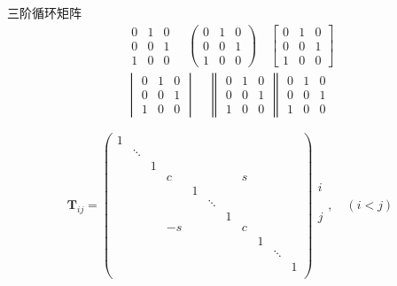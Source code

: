 \documentclass[UTF8, a4paper, 12pt, oneside, onecolumn]{article}
\begin{document}
三阶循环矩阵
\begin{gather*}
	\begin{matrix}
		0 & 1 & 0 \\
		0 & 0 & 1 \\
		1 & 0 & 0
	\end{matrix}\quad
	\begin{pmatrix}
		0 & 1 & 0 \\
		0 & 0 & 1 \\
		1 & 0 & 0
	\end{pmatrix}\quad
	\begin{bmatrix}
		0 & 1 & 0 \\
		0 & 0 & 1 \\
		1 & 0 & 0
	\end{bmatrix}\\
	\begin{vmatrix}
		0 & 1 & 0 \\
		0 & 0 & 1 \\
		1 & 0 & 0
	\end{vmatrix}\quad
	\begin{Vmatrix}
		0 & 1 & 0 \\
		0 & 0 & 1 \\
		1 & 0 & 0
	\end{Vmatrix}
	\begin{smallmatrix}
		0 & 1 & 0 \\
		0 & 0 & 1 \\
		1 & 0 & 0
	\end{smallmatrix}
\end{gather*}

\[\bm T_{ij} = \begin{pmatrix}
	1 \\
		& \ddots \\
		&		& 1 \\
		&		&	& c		&	 &		&	 & s \\
		&		&	&		& 1 \\
		&		&	&		&	& \ddots \\
		&		&	&		&	&		& 1 \\
		&		&	& -s	&	&		&	& c \\
		&		&	&		&	&		&	&	& 1 \\
		&		&	&		&	&		&	&	&	& \ddots \\
		&		&	&		&	&		&	&	&	&		& 1 \\
\end{pmatrix} \begin{matrix}
\\
\\
\\
i \\
\\
\\
\\
j \\
\\
\\
\\
\end{matrix},\quad (i < j)\]
\end{document}
